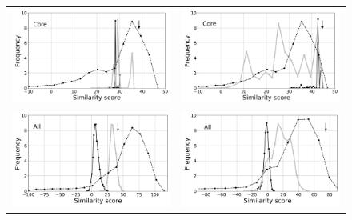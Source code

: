 \documentclass[a4paper,12pt]{article}
\begin{document}
\begin{figure}[t]
\begin{tabular}{cc}
       \includegraphics[width=8.4cm]{rapport/resultats/PDZ/graphe/modelB6+/1R6J_simil_core.png} &
       \includegraphics[width=8.4cm]{rapport/resultats/PDZ/graphe/modelB6+/2BYG_simil_core.png} \\
       \includegraphics[width=8.4cm]{rapport/resultats/PDZ/graphe/modelB6+/1R6J_simil_cut.png} &
       \includegraphics[width=8.4cm]{rapport/resultats/PDZ/graphe/modelB6+/2BYG_simil_cut.png} \\

     \end{tabular}
\label{graph:Simil_histo}
   \end{figure}
\thispagestyle{empty}
\end{document}
